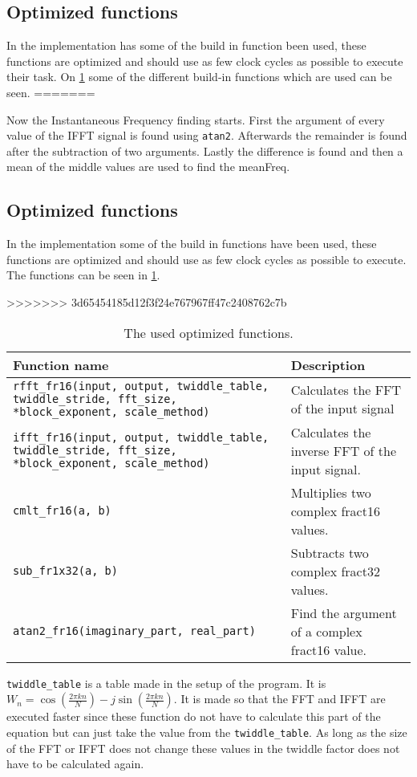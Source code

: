 \subsection{Optimized functions}
In the implementation has some of the build in function been used, these functions are optimized and should use as few clock cycles as possible to execute their task. On \cref{tab:optimized_func}  some of the different build-in functions which are used can be seen.
=======

Now the Instantaneous Frequency finding starts. First the argument of every value of the IFFT signal is found using \texttt{atan2}.
Afterwards the remainder is found after the subtraction of two arguments.
Lastly the difference is found and then a mean of the middle values are used to find the meanFreq.

\subsection{Optimized functions}
In the implementation some of the build in functions have been used, these functions are optimized and should use as few clock cycles as possible to execute. The functions can be seen in \cref{tab:optimized_func}.

>>>>>>> 3d65454185d12f3f24e767967ff47c2408762c7b
\begin{table}
	\centering
	\begin{tabularx}{\textwidth}{X X}
		\toprule
		\textbf{Function name} & \textbf{Description }\\
		\midrule
		\texttt{rfft_fr16(input, output, twiddle_table, twiddle_stride, fft_size, *block_exponent, scale_method)} & Calculates the FFT of the input signal\\
		\texttt{ifft_fr16(input, output, twiddle_table, twiddle_stride, fft_size, *block_exponent, scale_method)} & Calculates the inverse FFT of the input signal. \\
		\texttt{cmlt_fr16(a, b)} & Multiplies two complex fract16 values. \\
		\texttt{sub_fr1x32(a, b)}& Subtracts two complex fract32 values. \\
		\texttt{atan2_fr16(imaginary_part, real_part)} & Find the argument of a complex fract16 value. \\
		\bottomrule
	\end{tabularx}
	\caption{The used optimized functions.}
	\label{tab:optimized_func}
\end{table}

\texttt{twiddle_table} is a table made in the setup of the program.
It is $W_n = \cos(\frac{2\pi kn}{N})-j\sin(\frac{2\pi kn}{N})$.
It is made so that the FFT and IFFT are executed faster since these function do not have to calculate this part of the equation but can just take the value from the \texttt{twiddle_table}.
As long as the size of the FFT or IFFT does not change these values in the twiddle factor does not have to be calculated again.

\FloatBarrier